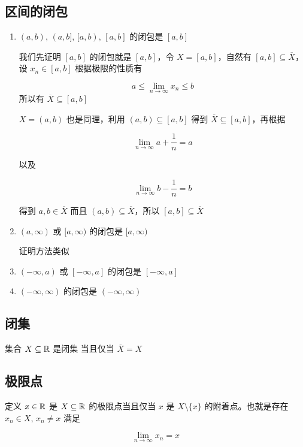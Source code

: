 \subsection{区间的闭包}

\begin{enumerate}
    \item $(a,b),\, (a,b],\, [a,b),\, [a,b]$ 的闭包是 $[a,b]$


    我们先证明 $[a,b]$ 的闭包就是 $[a,b]$，令 $X = [a,b]$，自然有 $[a,b] \subseteq \overline{X}$，设 $x_n \in [a,b]$ 根据极限的性质有

    \[
        a \le \lim_{n \to \infty} x_n \le b
    \]
    所以有 $\overline{X} \subseteq [a,b]$

    $X= (a,b)$ 也是同理，利用 $(a,b) \subseteq [a,b]$ 得到 $\overline{X} \subseteq [a,b]$，再根据

    \[
        \lim_{n \to \infty} a+ \frac{1}{n} = a
    \]

    以及

    \[
        \lim_{n \to \infty} b- \frac{1}{n} = b
    \]

    得到 $a,b \in \overline{X}$ 而且 $(a,b) \subseteq \overline{X}$，所以 $[a,b] \subseteq \overline{X}$

    \item $(a, \infty)$ 或 $[a,\infty)$ 的闭包是 $[a, \infty)$

    证明方法类似

    \item $(-\infty, a)$ 或 $[-\infty, a]$ 的闭包是 $[-\infty, a]$

    \item $(-\infty, \infty)$ 的闭包是 $(-\infty, \infty)$

\end{enumerate}

\subsection{闭集}

集合 $X \subseteq \mathbb{R}$ 是闭集 当且仅当 $\overline{X} = X$

\subsection{极限点}

定义 $x \in \mathbb{R}$ 是 $X \subseteq \mathbb{R}$ 的极限点当且仅当 $x$ 是 $X \setminus \{ x\} $ 的附着点。也就是存在 $x_n \in X,\, x_n \ne x$ 满足

\[
\lim_{n \to \infty} x_n =x
\]

